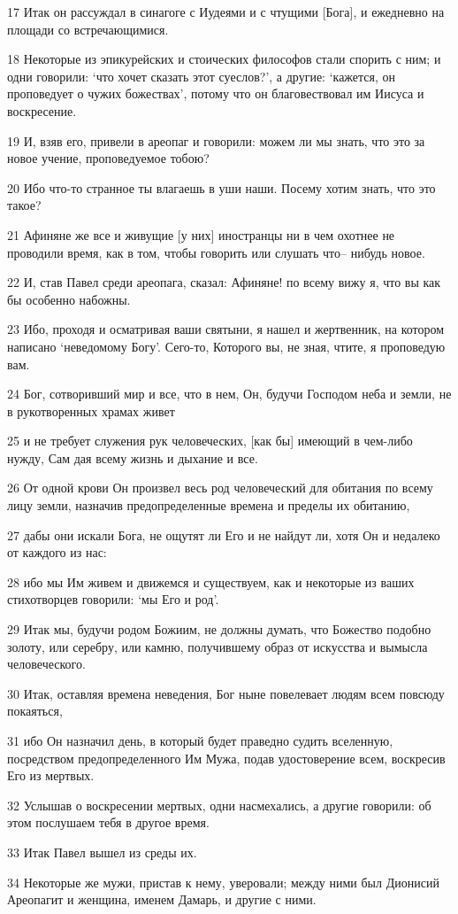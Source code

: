 \par 17 Итак он рассуждал в синагоге с Иудеями и с чтущими [Бога], и ежедневно на площади со встречающимися.
\par 18 Некоторые из эпикурейских и стоических философов стали спорить с ним; и одни говорили: `что хочет сказать этот суеслов?', а другие: `кажется, он проповедует о чужих божествах', потому что он благовествовал им Иисуса и воскресение.
\par 19 И, взяв его, привели в ареопаг и говорили: можем ли мы знать, что это за новое учение, проповедуемое тобою?
\par 20 Ибо что-то странное ты влагаешь в уши наши. Посему хотим знать, что это такое?
\par 21 Афиняне же все и живущие [у них] иностранцы ни в чем охотнее не проводили время, как в том, чтобы говорить или слушать что-- нибудь новое.
\par 22 И, став Павел среди ареопага, сказал: Афиняне! по всему вижу я, что вы как бы особенно набожны.
\par 23 Ибо, проходя и осматривая ваши святыни, я нашел и жертвенник, на котором написано `неведомому Богу'. Сего-то, Которого вы, не зная, чтите, я проповедую вам.
\par 24 Бог, сотворивший мир и все, что в нем, Он, будучи Господом неба и земли, не в рукотворенных храмах живет
\par 25 и не требует служения рук человеческих, [как бы] имеющий в чем-либо нужду, Сам дая всему жизнь и дыхание и все.
\par 26 От одной крови Он произвел весь род человеческий для обитания по всему лицу земли, назначив предопределенные времена и пределы их обитанию,
\par 27 дабы они искали Бога, не ощутят ли Его и не найдут ли, хотя Он и недалеко от каждого из нас:
\par 28 ибо мы Им живем и движемся и существуем, как и некоторые из ваших стихотворцев говорили: `мы Его и род'.
\par 29 Итак мы, будучи родом Божиим, не должны думать, что Божество подобно золоту, или серебру, или камню, получившему образ от искусства и вымысла человеческого.
\par 30 Итак, оставляя времена неведения, Бог ныне повелевает людям всем повсюду покаяться,
\par 31 ибо Он назначил день, в который будет праведно судить вселенную, посредством предопределенного Им Мужа, подав удостоверение всем, воскресив Его из мертвых.
\par 32 Услышав о воскресении мертвых, одни насмехались, а другие говорили: об этом послушаем тебя в другое время.
\par 33 Итак Павел вышел из среды их.
\par 34 Некоторые же мужи, пристав к нему, уверовали; между ними был Дионисий Ареопагит и женщина, именем Дамарь, и другие с ними.

